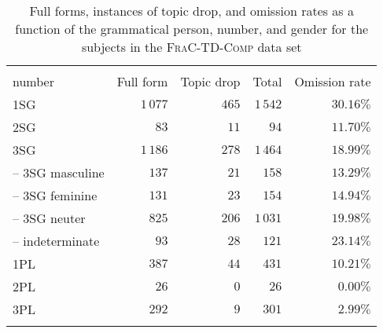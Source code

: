 \begin{table}
\caption{Full forms, instances of topic drop, and omission rates as a function of the grammatical person, number, and gender for the subjects in the \textsc{FraC-TD-Comp} data set}
\centering
\begin{tabular}{lrrrr}
\lsptoprule
\Centerstack[c]{Grammatical person,\\number} & \multicolumn{1}{c}{\multirow{-1}{*}{Full form}}  & \multicolumn{1}{c}{\multirow{-1}{*}{Topic drop}} & \multicolumn{1}{c}{\multirow{-1}{*}{Total}} & \multicolumn{1}{c}{\multirow{-1}{*}{Omission rate}} \\
\midrule
1SG & $1\,077$ & $465$ & $1\,542$ & $30.16\%$\\
2SG & $83$ & $11$ & $94$ & $11.70\%$\\
3SG & $1\,186$ & $278$ & $1\,464$ & $18.99\%$\\
-- 3SG masculine & $137$ & $21$ & $158$ & $13.29\%$ \\
-- 3SG feminine & $131$ & $23$ & $154$ & $14.94\%$\\
-- 3SG neuter & $825$ & $206$ & $1\,031$ & $19.98\%$\\
-- indeterminate & $93$ & $28$ & $121$ & $23.14\%$\\
1PL & $387$ & $44$ & $431$ & $10.21\%$ \\
2PL & $26$ & $0$ & $26$ &  $0.00\%$\\
3PL & $292$ & $9$ & $301$ & $2.99\%$\\
\lspbottomrule
\end{tabular}
\label{tab:FraC.Comp.person.subj}
\end{table}


